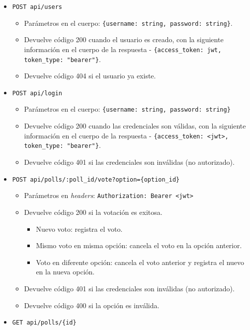 \documentclass[11pt]{article}
\newcommand{\english}[1]{\textit{#1}}
\begin{document}
\begin{itemize}
    \item \lstinline|POST api/users|
    \begin{itemize}
        \item Parámetros en el cuerpo: \lstinline|{username: string, password: string}|.
        \item Devuelve código 200 cuando el usuario es creado, con la siguiente información en el cuerpo de la respuesta - \lstinline|{access_token: jwt, token_type: "bearer"}|.
        \item Devuelve código 404 si el usuario ya existe.
    \end{itemize}
    \item \lstinline|POST api/login|
    \begin{itemize}
        \item Parámetros en el cuerpo: \lstinline|{username: string, password: string}|
        \item Devuelve código 200 cuando las credenciales son válidas, con la siguiente información en el cuerpo de la respuesta - \lstinline|{access_token: <jwt>, token_type: "bearer"}|.
        \item Devuelve código 401 si las credenciales son inválidas (no autorizado).
    \end{itemize}
        \item \lstinline|POST api/polls/:poll_id/vote?option={option_id}|
    \begin{itemize}
        \item Parámetros en \english{headers}: \lstinline|Authorization: Bearer <jwt>|
        \item Devuelve código 200 si la votación es exitosa.
        \begin{itemize}
            \item Nuevo voto: registra el voto.
            \item Mismo voto en misma opción: cancela el voto en la opción anterior.
            \item Voto en diferente opción: cancela el voto anterior y registra el nuevo en la nueva opción.
        \end{itemize}
        \item Devuelve código 401 si las credenciales son inválidas (no autorizado).
        \item Devuelve código 400 si la opción es inválida.
    \end{itemize}
    \item \lstinline|GET api/polls/{id}|

\end{itemize}
\end{document}
